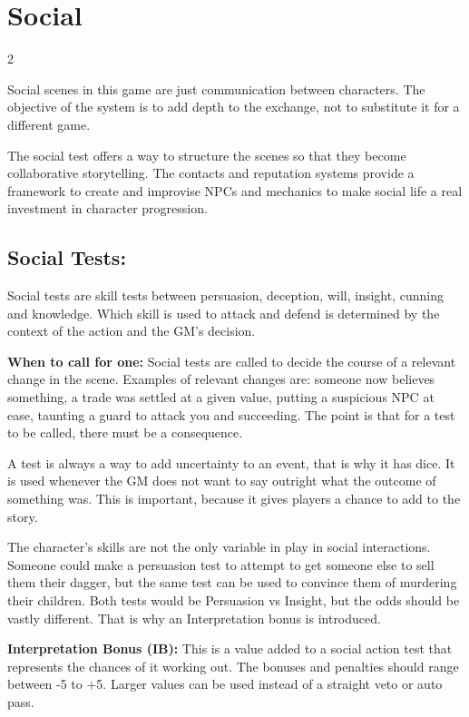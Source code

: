 \chapter{Social}

\begin{multicols}{2}

Social scenes in this game are just communication between characters. The objective of the system is to add depth to the exchange, not to substitute it for a different game. 

The social test offers a way to structure the scenes so that they become collaborative storytelling. The contacts and reputation systems provide a framework to create and improvise NPCs and mechanics to make social life a real investment in character progression. 


\section{Social Tests:}

Social tests are skill tests between persuasion, deception, will, insight, cunning and knowledge. Which skill is used to attack and defend is determined by the context of the action and the GM's decision. 

\textbf{When to call for one:} Social tests are called to decide the course of a relevant change in the scene. Examples of relevant changes are: someone now believes something, a trade was settled at a given value, putting a suspicious NPC at ease, taunting a guard to attack you and succeeding. The point is that for a test to be called, there must be a consequence. 

A test is always a way to add uncertainty to an event, that is why it has dice. It is used whenever the GM does not want to say outright what the outcome of something was. This is important, because it gives players a chance to add to the story.

The character's skills are not the only variable in play in social interactions. Someone could make a persuasion test to attempt to get someone else to sell them their dagger, but the same test can be used to convince them of murdering their children. Both tests would be Persuasion vs Insight, but the odds should be vastly different. That is why an Interpretation bonus is introduced. 

\textbf{Interpretation Bonus (IB):} This is a value added to a social action test that represents the chances of it working out. The bonuses and penalties should range between -5 to +5. Larger values can be used instead of a straight veto or auto pass.


\end{multicols}
